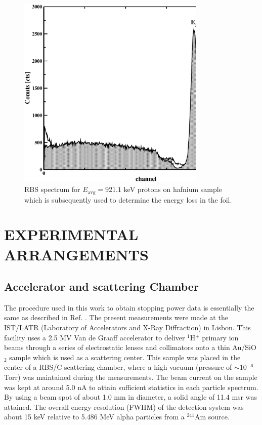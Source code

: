 \documentclass[aps,pra,reprint,groupedaddress]{revtex4-1}
\begin{document}
\begin{figure}[!t]
\centering
\includegraphics[width=9cm]{Fig01.eps}
\caption{RBS spectrum for $E_{\mathrm{avg}} = 921.1$ keV protons on hafnium sample which is subsequently used to determine the energy loss in the foil.}
\label{F01}
\end{figure}


\section{EXPERIMENTAL ARRANGEMENTS}
\label{experiment}
\subsection{Accelerator and scattering Chamber}
The procedure used in this work to obtain stopping power data is essentially the same as described in Ref. \cite{Miranda01}. The present measurements were made at the IST/LATR
(Laboratory of Accelerators and X-Ray Diffraction) in Lisbon. This facility uses a 2.5 MV Van de Graaff accelerator to deliver $^1$H$^+$ primary ion beams through a series of electrostatic lenses and collimators onto a thin Au/SiO$_2$ sample which is used as a scattering center. This sample was placed in the center of a RBS/C scattering chamber, where a high vacuum (pressure of
$\sim$10$^{-6}$ Torr) was maintained during the measurements. The beam current on the sample was kept at around 5.0 nA to attain sufficient statistics in each particle spectrum.
By using a beam spot of about 1.0 mm in diameter, a solid angle of 11.4 msr was attained. The overall energy resolution (FWHM) of the detection system was about 15 keV relative to 5.486 MeV alpha particles from a $^{241}$Am source.
\end{document}
